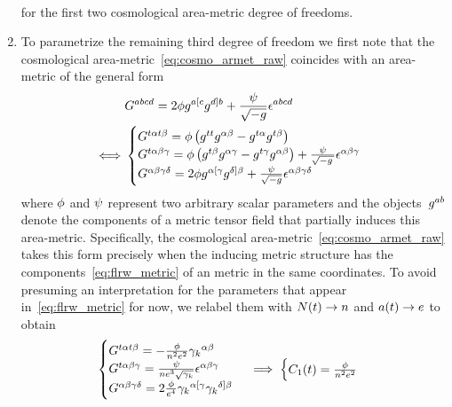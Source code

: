 \begin{enumerate}
\begin{align}
		\end{align}
		for the first two cosmological area-metric degree of freedoms.
	\item To parametrize the remaining third degree of freedom we first note that the cosmological area-metric~\eqref{eq:cosmo_armet_raw} coincides with an area-metric of the general form
		\begin{align}\label{eq:axdil_armet}
			&G^{abcd}=2\phi g^{a[ c}g^{d] b}+\frac{\psi}{\sqrt{-g}}\epsilon^{abcd}\\
			\iff &\begin{cases}
				G^{t\alpha t\beta}=\phi\left(g^{tt}g^{\alpha\beta}-g^{t\alpha}g^{t\beta}\right)\\
				G^{t\alpha\beta\gamma}=\phi\left(g^{t\beta}g^{\alpha\gamma}-g^{t\gamma}g^{\alpha\beta}\right)+\frac{\psi}{\sqrt{-g\,}}\epsilon^{\alpha\beta\gamma}\\
				G^{\alpha\beta\gamma\delta}=2\phi g^{\alpha[\gamma}g^{\delta]\beta}+\frac{\psi}{\sqrt{-g}}\epsilon^{\alpha\beta\gamma\delta}
			\end{cases}
		\end{align}
		where $\phi$ and $\psi$ represent two arbitrary scalar parameters and the objects~$g^{ab}$ denote the components of a metric tensor field that partially induces this area-metric. Specifically, the cosmological area-metric~\eqref{eq:cosmo_armet_raw} takes this form precisely when the inducing metric structure has the components~\eqref{eq:flrw_metric} of an \FLRW{} metric in the same coordinates. To avoid presuming an interpretation for the parameters that appear in~\eqref{eq:flrw_metric} for now, we relabel them with $N(t)\to n$ and $a(t)\to e$ to obtain
		\begin{equation}
			\begin{cases}
				G^{t\alpha t\beta}=-\frac{\phi}{n^2e^2}{\gamma_{k}}^{\alpha\beta}\\
				G^{t\alpha\beta\gamma}=\frac{\psi}{ne^3\sqrt{{\gamma_{k}}}}\epsilon^{\alpha\beta\gamma}\\
				G^{\alpha\beta\gamma\delta}=2\frac{\phi}{e^4}{\gamma_{k}}^{\alpha[\gamma}{\gamma_{k}}^{\delta]\beta}
			\end{cases} \implies \begin{cases}
				C_1(t)=\frac{\phi}{n^2e^2}\\

\end{cases}
\end{equation}
\end{enumerate}
